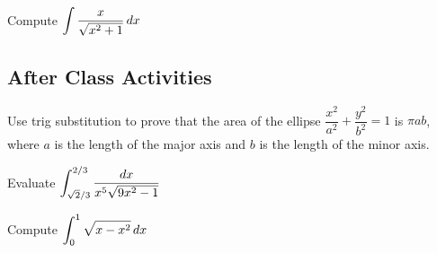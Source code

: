 \documentclass[notes]{subfiles}
\begin{document}
		\begin{ex}
			Compute $\displaystyle \int \dfrac{x}{\sqrt{x^2 + 1}}\, dx$
		\end{ex}
			
		\newpage
	\subsection*{After Class Activities}
		\begin{ex}
			Use trig substitution to prove that the area of the ellipse $\dfrac{x^2}{a^2} + \dfrac{y^2}{b^2} = 1$ is $\pi ab$, where $a$ is the length of the major axis and $b$ is the length of the minor axis. 
		\end{ex}
			\newpage
			
		\begin{ex}
			Evaluate $\displaystyle \int_{\sqrt{2}/3}^{2/3} \dfrac{dx}{x^5\sqrt{9x^2-1}}$
		\end{ex}
			
		\begin{ex}
			Compute $\displaystyle \int_0^1 \sqrt{x-x^2}\, dx$
		\end{ex}
	
\clearpage
\end{document}

